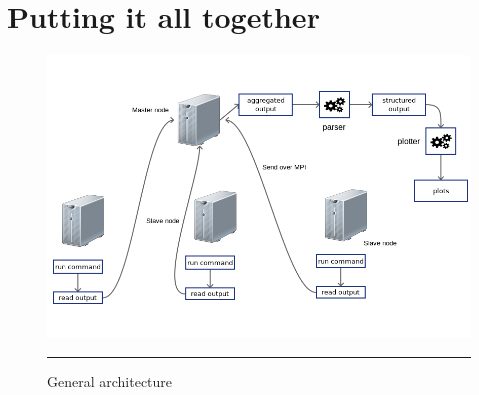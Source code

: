 

\section{Putting it all together}

\begin{figure}[H]
  \centering
    \includegraphics[scale=0.5]{Figures/architecture.png}
    \rule{25em}{0.5pt}
  \caption[General architecture]{General architecture}
  \label{fig:architecture}
\end{figure}


